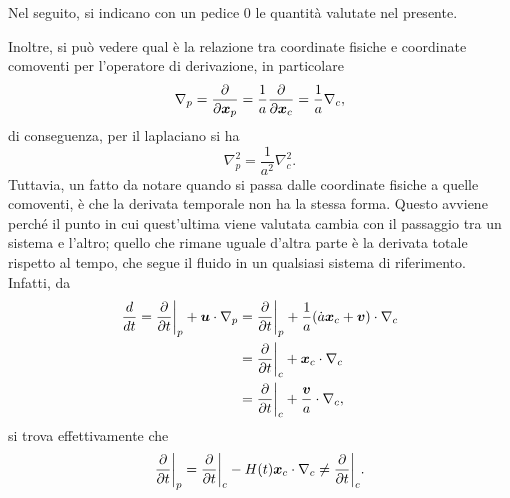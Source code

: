 \begin{notz}
    Nel seguito, si indicano con un pedice $0$ le quantità valutate nel presente.
\end{notz}
Inoltre, si può vedere qual è la relazione tra coordinate fisiche e coordinate comoventi per l'operatore di derivazione, in particolare
\begin{equation}
    \nabla_p = \frac{\partial}{\partial\bm{x}_p} = \frac{1}{a}\frac{\partial}{\partial\bm{x}_c} = \frac{1}{a}\nabla_c,
\end{equation}
di conseguenza, per il laplaciano si ha
\begin{equation}
    \nabla_p^2 = \frac{1}{a^2}\nabla_c^2.
\end{equation}
Tuttavia, un fatto da notare quando si passa dalle coordinate fisiche a quelle comoventi, è che la derivata temporale non ha la stessa forma. Questo avviene perché il punto in cui quest'ultima viene valutata cambia con il passaggio tra un sistema e l'altro; quello che rimane uguale d'altra parte è la derivata totale rispetto al tempo, che segue il fluido in un qualsiasi sistema di riferimento. Infatti, da
\begin{equation}
    \begin{split}
        \frac{d}{dt} = \frac{\partial}{\partial t}\bigg|_p + \bm{u}\cdot \nabla_p &= \frac{\partial}{\partial t}\bigg|_p + \frac{1}{a}(\dot{a}\bm{x}_c + \bm{v})\cdot \nabla_c \\
        &= \frac{\partial}{\partial t}\bigg|_c + \bm{x}_c \cdot \nabla_c \\
        &= \frac{\partial}{\partial t}\bigg|_c + \frac{\bm{v}}{a} \cdot \nabla_c,
    \end{split}
\end{equation}
si trova effettivamente che 
\begin{equation}
    \frac{\partial}{\partial t}\bigg|_p = \frac{\partial}{\partial t}\bigg|_c - H(t)\bm{x}_c \cdot \nabla_c \neq \frac{\partial}{\partial t}\bigg|_c.
\end{equation}

